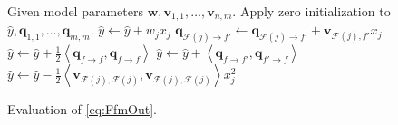 \documentclass[11pt]{article}
\newcommand{\bsym}[1]{\ensuremath{\boldsymbol{#1}}}
\newcommand{\bw}{\ensuremath{\bsym{w}}}
\newcommand{\bv}{\ensuremath{\bsym{v}}}
\newcommand{\bq}{\ensuremath{\bsym{q}}}
\newcommand{\field}{\ensuremath{\mathcal F}}
\newcommand{\dotprod}[2]{\ensuremath{\left\langle #1,#2 \right\rangle}}
\begin{document}
\begin{algorithm}
    \begin{algorithmic}[1]
        \State Given model parameters $\bw,\bv_{1,1},\dots,\bv_{n,m}$.
        \State Apply zero initialization to $\hat{y},\bq_{1,1},\dots,\bq_{m,m}$.
            \EndIf
            \State $\hat{y} \gets \hat{y} + w_jx_j$ 
                \State $\bq_{\field(j)\rightarrow f'} \gets \bq_{\field(j)\rightarrow f'} + \bv_{\field(j), f'} x_j$
            \EndFor
        \EndFor
            \State $\hat{y} \gets \hat{y} + \frac{1}{2}\dotprod{\bq_{f\rightarrow f}}{\bq_{f\rightarrow f}}$ 
                \State $\hat{y}\gets \hat{y} + \dotprod{\bq_{f\rightarrow f'}}{\bq_{f'\rightarrow f}}$ 
            \EndFor
        \EndFor
            \EndIf
            \State $\hat{y} \gets \hat{y} - \frac{1}{2} \dotprod{\bv_{\field(j),\field(j)}}{\bv_{\field(j),\field(j)}}x_j^2$ 
        \EndFor
    \end{algorithmic}
    \label{alg:FfmStepOne}
    \caption{Evaluation of \eqref{eq:FfmOut}.}
\end{algorithm}
\end{document}
